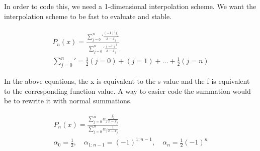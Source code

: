 \documentclass[12pt]{article}
\begin{document}
In order to code this, we need a 1-dimensional interpolation scheme. We want the interpolation scheme to be fast to evaluate and stable. 

\begin{align*}
P_n(x) = \frac{{\sum_{j = 0}^{n}}' \frac{(-1)^j f_j}{x-x_j}}{{\sum_{j = 0}^{n}}' \frac{(-1)^j}{x-x_j}} \\
{\sum _{j = 0}^{n}}' = \frac{1}{2}(j = 0) + (j = 1) + \dots + \frac{1}{2}(j = n)
\end{align*}

In the above equations, the x is equivalent to the s-value and the f is equivalent to the corresponding function value. A way to easier code the summation would be to rewrite it with normal summations.

\begin{align*}
P_n(x) = \frac{\sum_{j = 0}^{n} \alpha_j \frac{f_j}{x-x_j}}{\sum_{j = 0}^{n} \alpha_j\frac{1}{x-x_j}} \\
\alpha_0 = \frac{1}{2},\quad \alpha_{1:n-1} = (-1)^{1:n-1},\quad \alpha_n = \frac{1}{2} (-1)^n
\end{align*}
\end{document}
